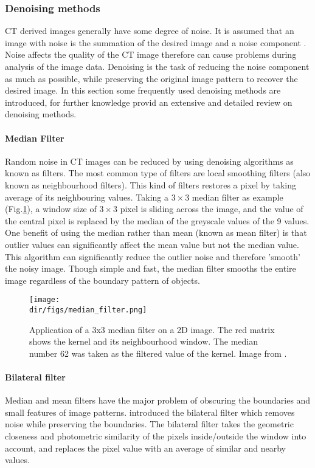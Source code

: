 \subsubsection{Denoising methods}
CT derived images generally have some degree of noise. It is assumed that an image with noise is the summation of the desired image and a noise component \citep{diwakar2018review}. Noise affects the quality of the CT image therefore can cause problems during analysis of the image data. Denoising is the task of reducing the noise component as much as possible, while preserving the original image pattern to recover the desired image. In this section some frequently used denoising methods are introduced, for further knowledge \citet{diwakar2018review} provid an extensive and detailed review on denoising methods.

\paragraph{Median Filter} Random noise in CT images can be reduced by using denoising algorithms as known as filters. The most common type of filters are local smoothing filters (also known as neighbourhood filters). This kind of filters restores a pixel by taking average of its neighbouring values. Taking a $3\times3$ median filter \citep{huang1979fast} as example (Fig.\ref{median}), a window size of $3\times3$ pixel is sliding across the image, and the value of the central pixel is replaced by the median of the greyscale values of the 9 values. One benefit of using the median rather than mean (known as mean filter) is that outlier values can significantly affect the mean value but not the median value. This algorithm can significantly reduce the outlier noise and therefore 'smooth' the noisy image. Though simple and fast, the median filter smooths the entire image regardless of the boundary pattern of objects. 

\begin{figure}[htbp]
  \centering
  \texttt{[image: \\dir/figs/median\_filter.png]}
  \caption{Application of a 3x3 median filter on a 2D image. The red matrix shows the kernel and its neighbourhood window. The median number 62 was taken as the filtered value of the kernel. Image from \citet{Pak2014thesis}.}
  \label{median}
\end{figure}

\paragraph{Bilateral filter}
Median and mean filters have the major problem of obscuring the boundaries and small features of image patterns. \citet{tomasi1998bilateral} introduced the bilateral filter which removes noise while preserving the boundaries. The bilateral filter takes the geometric closeness and photometric similarity of the pixels inside/outside the window into account, and replaces the pixel value with an average of similar and nearby values.

